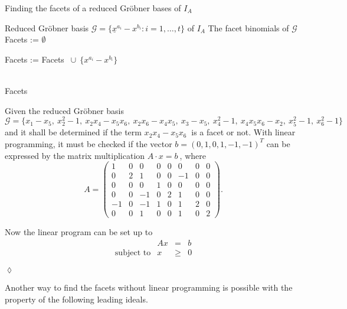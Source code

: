 \newpage

\begin{algorithm}
\caption{Finding the facets of a reduced Gröbner bases of $I_A$ \cite{tigers}}
\label{alg:facetsLP}
\label{facets}
\begin{algorithmic}[1]

\Input
Reduced Gröbner basis $ \mathcal{G} = \lbrace \underline{x}^{a_{i}} - {x}^{b_{i}} : i = 1,\dots,t  \rbrace $ of $I_A$
\Output The facet binomials of $\mathcal{G}$
\State Facets := $\emptyset$

\State Facets := Facets $~\cup~\{{x}^{a_{i}} - {x}^{b_{i}} \} $
\EndIf

\EndFor \\
\Return Facets
\end{algorithmic}
\end{algorithm}

\begin{env_example}\normalfont

Given the reduced Gröbner basis \\
 $\mathcal{G} = \{x_1 - x_5,~x_{2}^{2}-1,~x_{2}x_{4}-x_{5}x_{6},~x_{2}x_{6}-x_{4}x_{5},~x_{3}-x_{5},~x_{4}^{2}-1,~x_{4}x_{5}x_{6}-x_{2},~x_{5}^{2}-1,~x_{6}^{2}-1  \}~$ and it shall be determined if the term $x_{2}x_{4}-x_{5}x_{6}~$ is a facet or not.
 With linear programming, it must be checked if the vector $b = {\left(0,1,0,1,-1,-1\right)}^{T}$ can be expressed by the matrix multiplication $A \cdot x = b~$, where \\
 \[
 A =
 \begin{pmatrix}
 1  & 0 & 0  & 0 & 0 & 0  & 0 & 0\\ 
 0  & 2 & 1  & 0 & 0 & -1 & 0 & 0\\  
 0  & 0 & 0  & 1 & 0 & 0  & 0 & 0\\ 
 0  & 0 & -1 & 0 & 2 & 1  & 0 & 0\\
 -1 & 0 & -1 & 1 & 0 & 1  & 2 & 0\\
 0  & 0 & 1  & 0 & 0 & 1  & 0 & 2
 \end{pmatrix} 
 .\] 
  
 Now the linear program can be set up to 
 \[
 	\begin{array}{lrcl}
 	\textrm{ }   & Ax    & =    & b   \\
 	\textrm{subject to}  & x     & \geq & 0
 			    
 	\end{array}
 \]
 

\begin{flushright}
$\lozenge$
\end{flushright}
\end{env_example}
\newpage 
Another way to find the facets without linear programming is possible with the property of the following leading ideals.

